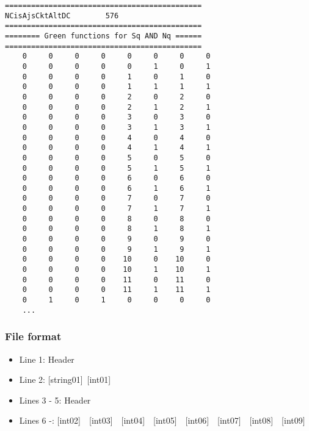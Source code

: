 \begin{minipage}{12.5cm}
\begin{screen}
\begin{verbatim}
=============================================
NCisAjsCktAltDC        576
=============================================
======== Green functions for Sq AND Nq ======
=============================================
    0     0     0     0     0     0     0     0
    0     0     0     0     0     1     0     1
    0     0     0     0     1     0     1     0
    0     0     0     0     1     1     1     1
    0     0     0     0     2     0     2     0
    0     0     0     0     2     1     2     1
    0     0     0     0     3     0     3     0
    0     0     0     0     3     1     3     1
    0     0     0     0     4     0     4     0
    0     0     0     0     4     1     4     1
    0     0     0     0     5     0     5     0
    0     0     0     0     5     1     5     1
    0     0     0     0     6     0     6     0
    0     0     0     0     6     1     6     1
    0     0     0     0     7     0     7     0
    0     0     0     0     7     1     7     1
    0     0     0     0     8     0     8     0
    0     0     0     0     8     1     8     1
    0     0     0     0     9     0     9     0
    0     0     0     0     9     1     9     1
    0     0     0     0    10     0    10     0
    0     0     0     0    10     1    10     1
    0     0     0     0    11     0    11     0
    0     0     0     0    11     1    11     1
    0     1     0     1     0     0     0     0
    ...
\end{verbatim}
\end{screen}
\end{minipage}

\subsubsection{File format}
 \begin{itemize}
   \item  Line 1:  Header
   \item  Line 2:   [string01]~[int01]
   \item  Lines 3 - 5:  Header
   \item  Lines 6 -: 
   [int02]~~[int03]~~[int04]~~[int05]~~[int06]~~[int07]~~[int08]~~[int09]
  \end{itemize}
